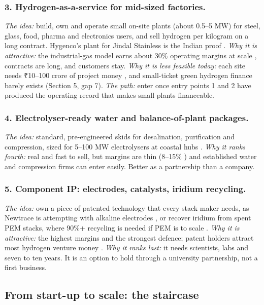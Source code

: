 \subsubsection{3. Hydrogen-as-a-service for mid-sized factories.}
\emph{The idea:} build, own and operate small on-site plants (about 0.5–5 MW) for steel, glass, food, pharma and electronics users, and sell hydrogen per kilogram on a long contract. Hygenco's plant for Jindal Stainless is the Indian proof \cite{hygenco2024}.
\emph{Why it is attractive:} the industrial-gas model earns about 30\% operating margins at scale \cite{linde2026}, contracts are long, and customers stay.
\emph{Why it is less feasible today:} each site needs ₹10–100 crore of project money \estd, and small-ticket green hydrogen finance barely exists (Section 5, gap 7).
\emph{The path:} enter once entry points 1 and 2 have produced the operating record that makes small plants financeable. \confM

\subsubsection{4. Electrolyser-ready water and balance-of-plant packages.}
\emph{The idea:} standard, pre-engineered skids for desalination, purification and compression, sized for 5–100 MW electrolysers at coastal hubs \cite{rw2025}.
\emph{Why it ranks fourth:} real and fast to sell, but margins are thin (8–15\% \estd) and established water and compression firms can enter easily. Better as a partnership than a company. \confM

\subsubsection{5. Component IP: electrodes, catalysts, iridium recycling.}
\emph{The idea:} own a piece of patented technology that every stack maker needs, as Newtrace is attempting with alkaline electrodes \cite{newtrace2026}, or recover iridium from spent PEM stacks, where 90\%+ recycling is needed if PEM is to scale \cite{h2tech2022}.
\emph{Why it is attractive:} the highest margins and the strongest defence; patent holders attract most hydrogen venture money \cite{epo2023}.
\emph{Why it ranks last:} it needs scientists, labs and seven to ten years. It is an option to hold through a university partnership, not a first business. \confM

\subsection{From start-up to scale: the staircase}

